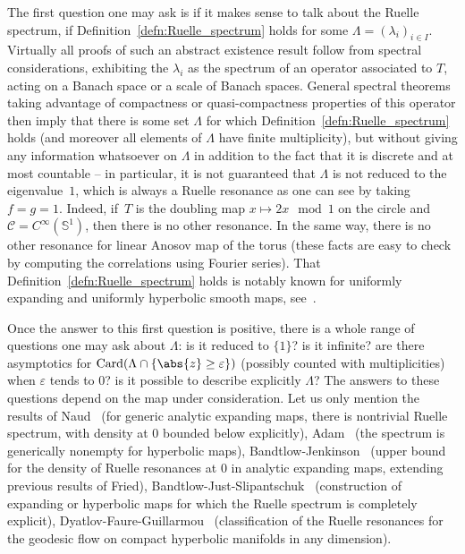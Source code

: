 \documentclass[10pt]{amsart}
\newcommand{\boC}{\mathcal{C}}
\newcommand{\Sbb}{\mathbb{S}}
\DeclareMathOperator{\Card}{Card}
\let\epsilon\varepsilon
\theoremstyle{definition}
\numberwithin{equation}{section}
\begin{document}
The first question one may ask is if it makes sense to talk about the Ruelle
spectrum, \ie if Definition~\ref{defn:Ruelle_spectrum} holds for some
$\Lambda=(\lambda_i)_{i\in I}$. Virtually all proofs of such an abstract
existence result follow from spectral considerations, exhibiting the
$\lambda_i$ as the spectrum of an operator associated to $T$, acting on a
Banach space or a scale of Banach spaces. General spectral theorems taking
advantage of compactness or quasi-compactness properties of this operator
then imply that there is some set $\Lambda$ for which
Definition~\ref{defn:Ruelle_spectrum} holds (and moreover all elements of
$\Lambda$ have finite multiplicity), but without giving any information
whatsoever on $\Lambda$ in addition to the fact that it is discrete and at
most countable -- in particular, it is not guaranteed that $\Lambda$ is not
reduced to the eigenvalue~$1$, which is always a Ruelle resonance as one can
see by taking $f=g=1$. Indeed, if~$T$ is the doubling map $x \mapsto 2 x \mod
1$ on the circle and $\boC=C^\infty(\Sbb^1)$, then there is no other
resonance. In the same way, there is no other resonance for linear Anosov map
of the torus (these facts are easy to check by computing the correlations
using Fourier series). That Definition~\ref{defn:Ruelle_spectrum} holds is
notably known for uniformly expanding and uniformly hyperbolic smooth maps,
see~\cite{ruelle_fredholm, bt_aniso,GL_Anosov2}.

Once the answer to this first question is positive, there is a whole range of
questions one may ask about $\Lambda$: is it reduced to $\{1\}$? is it
infinite? are there asymptotics for $\Card (\Lambda \cap \{\abs{z} \geq
\epsilon\})$ (possibly counted with multiplicities) when $\epsilon$ tends to
$0$? is it possible to describe explicitly $\Lambda$? The answers to these
questions depend on the map under consideration. Let us only mention the
results of Naud~\cite{naud_lower_bound} (for generic analytic expanding maps,
there is nontrivial Ruelle spectrum, with density at $0$ bounded below
explicitly), Adam~\cite{adam_hyperbolic} (the spectrum is generically
nonempty for hyperbolic maps),
Bandtlow-Jenkinson~\cite{bandtlow_jenkinson_upper} (upper bound for the
density of Ruelle resonances at $0$ in analytic expanding maps, extending
previous results of Fried),
Bandtlow-Just-Slipantschuk~\cite{bandtlow_just_slipantschuk_expanding,
bandtlow_just_slipantschuk_hyperbolic} (construction of expanding or
hyperbolic maps for which the Ruelle spectrum is completely explicit),
Dyatlov-Faure-Guillarmou~\cite{dyatlov_faure_guillarmou} (classification of
the Ruelle resonances for the geodesic flow on compact hyperbolic manifolds
in any dimension).
\end{document}
